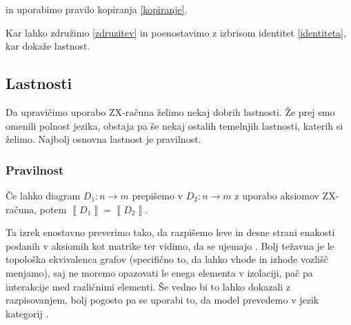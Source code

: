 \documentclass[mat1]{fmfdelo}
\newcommand{\interpret}[1]{\left\llbracket #1 \right\rrbracket}
\begin{document}
in uporabimo pravilo kopiranja \ref{kopiranje}.
\begin{center}
\end{center}
Kar lahko združimo \ref{zdruzitev} in poenostavimo z izbrisom identitet \ref{identiteta}, kar dokaže lastnost.
\begin{center}
\end{center}
\subsection{Lastnosti}
Da upravičimo uporabo ZX-računa želimo nekaj dobrih lastnosti. Že prej smo omenili polnost jezika, obstaja pa še nekaj ostalih temelnjih lastnosti, katerih si želimo. Najbolj osnovna lastnost je pravilnost.
\subsubsection{Pravilnost}
\begin{izrek}[Pravilnost]
    Če lahko diagram \(D_1:n\to m\) prepišemo v \(D_2:n\to m\) z uporabo aksiomov ZX-računa, potem \(\interpret{D_1} = \interpret{D_2}\).
\end{izrek}
Ta izrek enostavno preverimo tako, da razpišemo leve in desne strani enakosti podanih v aksiomih kot matrike ter vidimo, da se ujemajo \cite[izrek 2.16]{Coecke_2011}. Bolj težavna je le topološka ekvivalenca grafov (specifično to, da lahko vhode in izhode vozlišč menjamo), saj ne moremo opazovati le enega elementa v izolaciji, pač pa interakcije med različnimi elementi. Še vedno bi to lahko dokazali z razpisovanjem, bolj pogosto pa se uporabi to, da model prevedemo v jezik kategorij \cite[izrek 4.24]{Coecke_2011}.
\end{document}
